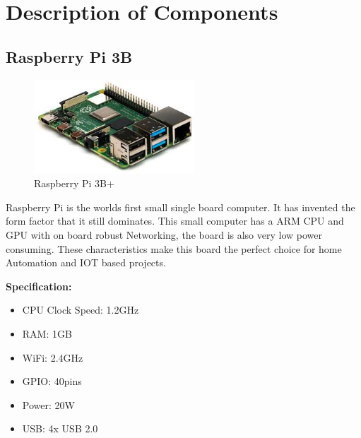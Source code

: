 \section{Description of Components}

    \subsection{Raspberry Pi 3B}
        \begin{figure}[H]
            \centering
            \includegraphics[width=6cm]{images/rpi.jpg}
            \caption{Raspberry Pi 3B+}
        \end{figure}

        \begin{flushleft}
            Raspberry Pi is the worlds first small single board computer. It has invented the form factor that it still dominates. 
            This small computer has a ARM CPU and GPU with on board robust Networking, the board is also very low power consuming. 
            These characteristics make this board the perfect choice for home Automation and IOT based projects.
        \end{flushleft}
        \textbf{Specification: }
        \begin{itemize}
            \item CPU Clock Speed: 1.2GHz
            \item RAM: 1GB
            \item WiFi: 2.4GHz
            \item GPIO: 40pins
            \item Power: 20W
            \item USB: 4x USB 2.0
        \end{itemize}

